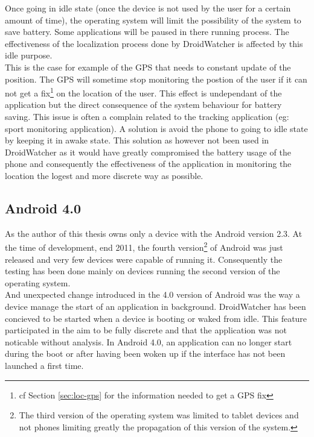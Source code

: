 Once going in idle state (once the device is not used by the user for a certain amount of time), the operating system will limit the possibility of the system to save battery.
Some applications will be paused in there running process.
The effectiveness of the localization process done by DroidWatcher is affected by this idle purpose.\\

This is the case for example of the GPS that needs to constant update of the position.
The GPS will sometime stop monitoring the postion of the user if it can not get a fix\footnote{cf Section \ref{sec:loc-gps} for the information needed to get a GPS fix} on the location of the user.
This effect is undependant of the application but the direct consequence of the system behaviour for battery saving. 
This issue is often a complain related to the tracking application (eg: sport monitoring application).
A solution is avoid the phone to going to idle state by keeping it in awake state.
This solution as however not been used in DroidWatcher as it would have greatly compromised the battery usage of the phone and consequently the effectiveness of the application in monitoring the location the logest and more discrete way as possible.

\subsection{Android 4.0}
\label{sec:dw-ics}

As the author of this thesis owns only a device with the Android version 2.3.
At the time of development, end 2011, the fourth version\footnote{The third version of the operating system was limited to tablet devices and not phones limiting greatly the propagation of this version of the system.} of Android was just released and very few devices were capable of running it.
Consequently the testing has been done mainly on devices running the second version of the operating system.\\

And unexpected change introduced in the 4.0 version of Android was the way a device manage the start of an application in background.
DroidWatcher has been concieved to be started when a device is booting or waked from idle.
This feature participated in the aim to be fully discrete and that the application was not noticable without analysis.
In Android 4.0, an application can no longer start during the boot or after having been woken up if the interface has not been launched a first time.\\

